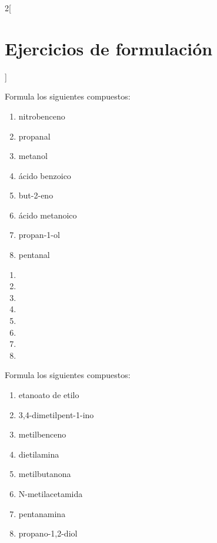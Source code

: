 \documentclass[10pt]{article}
\begin{document}
\begin{multicols*}{2}[
  \section{Ejercicios de formulación}
  ]
\begin{exercise}[
    tags    = {orgánica,nomenclatura,múltiple,2B},
    topics  = {química orgánica,formulación,nomenclatura},
    source  = {Química 2B SAN 2016, p392, e23},
  ]
  Formula los siguientes compuestos:

  \begin{enumerate}
    \item nitrobenceno
    \item propanal
    \item metanol
    \item ácido benzoico
    \item but-2-eno
    \item ácido metanoico
    \item propan-1-ol
    \item pentanal
  \end{enumerate}
\end{exercise}

\begin{solution}
  \begin{enumerate}
    \item {}
    \item {}
    \item {}
    \item {}
    \item {}
    \item {}
    \item {}
    \item {}
  \end{enumerate}
\end{solution}



\begin{exercise}[
    tags    = {orgánica,nomenclatura,múltiple,2B},
    topics  = {química orgánica,formulación,nomenclatura},
    source  = {Química 2B SAN 2016, p392, e24},
  ]
  Formula los siguientes compuestos:

  \begin{enumerate}
    \item etanoato de etilo
    \item 3,4-dimetilpent-1-ino
    \item metilbenceno
    \item dietilamina
    \item metilbutanona
    \item N-metilacetamida
    \item pentanamina
    \item propano-1,2-diol
  \end{enumerate}
\end{exercise}


\end{multicols*}
\end{document}
